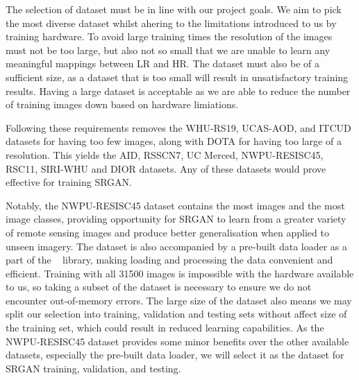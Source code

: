 The selection of dataset must be in line with our project goals. We aim to pick the most diverse dataset whilst ahering to the limitations introduced to us by training hardware. To avoid large training times the resolution of the images must not be too large, but also not so small that we are unable to learn any meaningful mappings between LR and HR. The dataset must also be of a sufficient size, as a dataset that is too small will result in unsatisfactory training results. Having a large dataset is acceptable as we are able to reduce the number of training images down based on hardware limiations.

Following these requirements removes the WHU-RS19, UCAS-AOD, and ITCUD datasets for having too few images, along with DOTA for having too large of a resolution. This yields the AID, RSSCN7, UC Merced, NWPU-RESISC45, RSC11, SIRI-WHU and DIOR datasets. Any of these datasets would prove effective for training SRGAN.

Notably, the NWPU-RESISC45 dataset contains the most images and the most image classes, providing opportunity for SRGAN to learn from a greater variety of remote sensing images and produce better generalisation when applied to unseen imagery. The dataset is also accompanied by a pre-built data loader as a part of the ~\cite{tensorflowDatasets}  library, making loading and processing the data convenient and efficient. Training with all 31500 images is impossible with the hardware available to us, so taking a subset of the dataset is necessary to ensure we do not encounter out-of-memory errors. The large size of the dataset also means we may split our selection into training, validation and testing sets without affect size of the training set, which could result in reduced learning capabilities. As the NWPU-RESISC45 dataset provides some minor benefits over the other available datasets, especially the pre-built data loader, we will select it as the dataset for SRGAN training, validation, and testing. 

